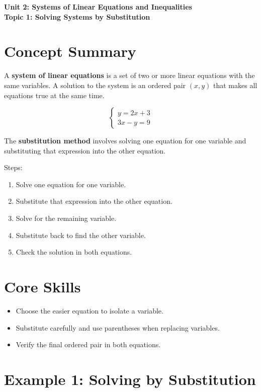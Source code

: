 \documentclass[12pt]{article}
\newcommand{\UnitTitle}{Unit 2: Systems of Linear Equations and Inequalities}
\newcommand{\TopicTitle}{Topic 1: Solving Systems by Substitution}
\begin{document}
\begin{center}
    \LARGE \textbf{\UnitTitle} \\[6pt]
    \Large \textbf{\TopicTitle}
\end{center}

\vspace{1em}

\section*{Concept Summary}

A \textbf{system of linear equations} is a set of two or more linear equations with the same variables.  
A solution to the system is an ordered pair \((x, y)\) that makes all equations true at the same time.

\[
\begin{cases}
y = 2x + 3 \\
3x - y = 9
\end{cases}
\]

The \textbf{substitution method} involves solving one equation for one variable and substituting that expression into the other equation.

Steps:
\begin{enumerate}
    \item Solve one equation for one variable.
    \item Substitute that expression into the other equation.
    \item Solve for the remaining variable.
    \item Substitute back to find the other variable.
    \item Check the solution in both equations.
\end{enumerate}

\section*{Core Skills}
\begin{itemize}
    \item Choose the easier equation to isolate a variable.
    \item Substitute carefully and use parentheses when replacing variables.
    \item Verify the final ordered pair in both equations.
\end{itemize}

\section*{Example 1: Solving by Substitution}
\end{document}
